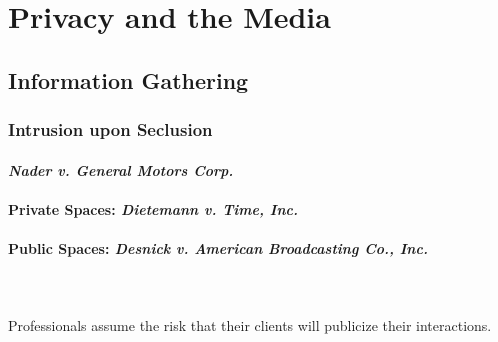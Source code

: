 \section{Privacy and the Media}

\subsection{Information Gathering}

\subsubsection{Intrusion upon Seclusion}


\paragraph{\emph{Nader v. General Motors Corp.}}


\paragraph{Private Spaces: \emph{Dietemann v. Time, Inc.}}


\paragraph{Public Spaces: \emph{Desnick v. American Broadcasting Co., Inc.}}
~\\\\
Professionals assume the risk that their clients will publicize their interactions.

